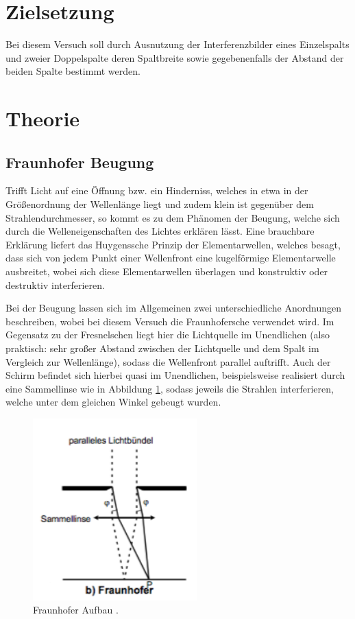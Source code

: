 \section{Zielsetzung}
Bei diesem Versuch soll durch Ausnutzung der Interferenzbilder eines Einzelspalts
und zweier Doppelspalte deren Spaltbreite sowie gegebenenfalls der Abstand der
beiden Spalte bestimmt werden.



\section{Theorie}
\label{sec:Theorie}
\subsection{Fraunhofer Beugung}
Trifft Licht auf eine Öffnung bzw. ein Hinderniss, welches in etwa in der Größenordnung
der Wellenlänge liegt und zudem klein ist gegenüber dem Strahlendurchmesser, so kommt es zu
dem Phänomen der Beugung, welche sich durch die Welleneigenschaften des Lichtes erklären lässt.
Eine brauchbare Erklärung liefert das Huygenssche Prinzip der Elementarwellen, welches
besagt, dass sich von jedem Punkt einer Wellenfront eine kugelförmige Elementarwelle ausbreitet,
wobei sich diese Elementarwellen überlagen und konstruktiv oder destruktiv interferieren.


\noindent Bei der Beugung lassen sich im Allgemeinen zwei unterschiedliche Anordnungen
beschreiben, wobei bei diesem Versuch die Fraunhofersche verwendet wird.
Im Gegensatz zu der Fresnelschen liegt hier die Lichtquelle im Unendlichen (also praktisch:
sehr großer Abstand zwischen der Lichtquelle und dem Spalt im Vergleich zur Wellenlänge),
sodass die Wellenfront parallel auftrifft. Auch der Schirm befindet sich hierbei quasi im
Unendlichen, beispielsweise realisiert durch eine Sammellinse wie in Abbildung
\ref{fig:fraun}, sodass jeweils die Strahlen interferieren, welche unter dem gleichen
Winkel gebeugt wurden.

\begin{figure}[H]
  \centering
  \includegraphics[height=7cm]{Fraunhofer.png}
  \caption{Fraunhofer Aufbau \cite{skript}.}
  \label{fig:fraun}
\end{figure}
